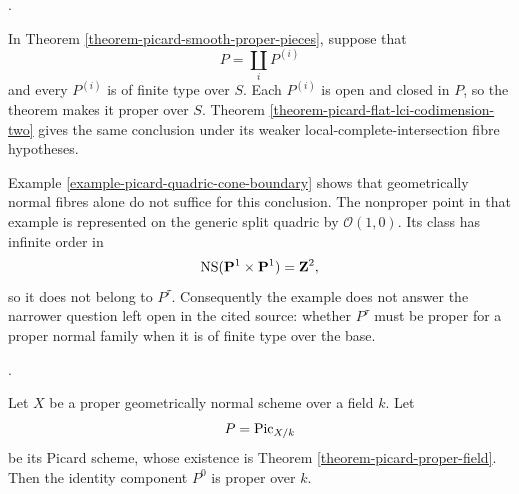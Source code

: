 \begin{remark}
\label{remark-picard-proper-pieces-boundary}
\begin{reference}
\cite[Expos\'e 236, Corollary 2.4 and the following comment,
p. 232]{FGA}.
\end{reference}
In Theorem \ref{theorem-picard-smooth-proper-pieces}, suppose that
$$
P=\coprod_i P^{(i)}
$$
and every $P^{(i)}$ is of finite type over $S$. Each $P^{(i)}$ is open and
closed in $P$, so the theorem makes it proper over $S$. Theorem
\ref{theorem-picard-flat-lci-codimension-two} gives the same conclusion under
its weaker local-complete-intersection fibre hypotheses.

Example \ref{example-picard-quadric-cone-boundary} shows that geometrically
normal fibres alone do not suffice for this conclusion. The nonproper point
in that example is represented on the generic split quadric by
$\mathcal{O}(1,0)$. Its class has infinite order in
$$
\mathop{\rm NS}(\mathbf P^1\times\mathbf P^1)=\mathbf Z^2,
$$
so it does not belong to $P^\tau$. Consequently the example does not answer
the narrower question left open in the cited source: whether $P^\tau$ must
be proper for a proper normal family when it is of finite type over the
base.
\end{remark}

\begin{theorem}
\label{theorem-picard-identity-component-proper-normal}
\begin{reference}
\cite[Expos\'e 236, Theorem 2.1(ii), pp. 231--232 and correction,
p. 303]{FGA}.
\end{reference}
Let $X$ be a proper geometrically normal scheme over a field $k$. Let
$$
P=\mathrm{Pic}_{X/k}
$$
be its Picard scheme, whose existence is Theorem
\ref{theorem-picard-proper-field}. Then the identity component $P^0$ is
proper over $k$.
\end{theorem}

